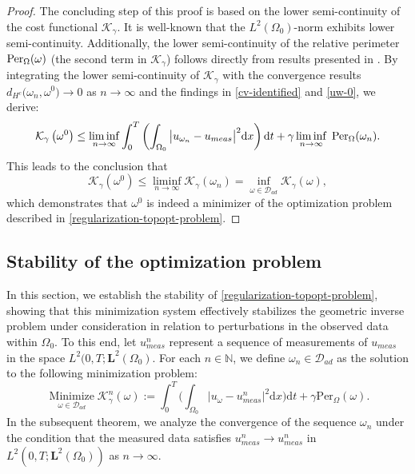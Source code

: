 \documentclass[a4paper,12pt,reqno,natbib]{amsart}
\newcommand{\dx} {\displaystyle\mathrm{d}x}
\newcommand{\dt} {\displaystyle\mathrm{d}t}
\def\K{\mathcal K}
\def\L{\textbf{L}}
\begin{document}
\begin{proof}
The concluding step of this proof is based on the lower semi-continuity of the cost functional  $\K_\gamma$. It is well-known that the 
$L^2(\Omega_0)$-norm exhibits lower semi-continuity. Additionally, the lower semi-continuity of the relative perimeter $\hbox{Per}_\Omega(\omega)$ (the second term in  $\K_\gamma$) follows directly from results presented in \cite{HenrotBook2005}. By integrating the lower semi-continuity of $\K_\gamma$ with the convergence results 
$d_{H^c}\big(\omega_n,\omega^0\big)\to0$ as $n\to\infty$ and the findings in \eqref{cv-identified} and \eqref{uw-0}, we derive:
\begin{equation}\mathcal{K}_\gamma\left(\omega^0\right)  \leq \liminf _{n \rightarrow \infty}\int_0^T \left(\int_{\Omega_0}\big|
u_{\omega_n}-u_{meas}\big|^2 \dx\right)\dt+\gamma \liminf _{n \rightarrow \infty}\;\hbox{Per}_\Omega(\omega_n).\end{equation}
This leads to the conclusion that
$$\mathcal{K}_\gamma\left(\omega^0\right) \leq \liminf _{n \rightarrow \infty} \mathcal{K}_\gamma\left(\omega_n\right)=\inf _{\omega\in \mathcal{D}_{ad}} \mathcal{K}_\gamma(\omega),$$
which demonstrates that $\omega^0$ is indeed a minimizer of the optimization problem described in \eqref{regularization-topopt-problem}.
\end{proof}




\subsection{Stability of the optimization problem}

In this section, we establish the stability of \eqref{regularization-topopt-problem}, showing that this minimization system effectively stabilizes the geometric inverse problem under consideration in relation to perturbations in the observed data within $\Omega_0$. To this end, let $u_{meas}^n$ represent a sequence of measurements of $u_{meas}$
  in the space $L^2(0,T;\L^2(\Omega_0)$. For each $n\in\mathbb{N}$, we define $\omega_n\in\mathcal{D}_{ad}$ as the solution to the following minimization problem:
\begin{equation}\label{reg-pertubed-optimi}
\operatorname*{Minimize}_{\omega\in \mathcal{D}_{ad}} \mathcal{K}^n_\gamma(\omega):=\int_0^T \big( \int_{\Omega_0} \big| u_\omega - u^n_{meas} \big|^2 \dx \big) \dt + \gamma \text{Per}_\Omega(\omega).
\end{equation}
In the subsequent theorem, we analyze the convergence of the sequence $\omega_n$ under the condition that the measured data satisfies $u_{meas}^n \longrightarrow u_{meas}^n$ in $L^2(0,T;\L^2(\Omega_0))$ as $n\longrightarrow \infty$.
\end{document}
